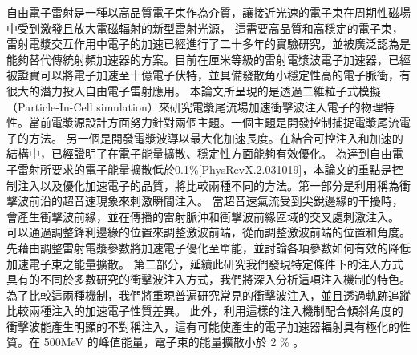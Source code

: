 
\begin{abstract*}
自由電子雷射是一種以高品質電子束作為介質，讓接近光速的電子束在周期性磁場中受到激發且放大電磁輻射的新型雷射光源，
這需要高品質和高穩定的電子束，雷射電漿交互作用中電子的加速已經進行了二十多年的實驗研究，並被廣泛認為是能夠替代傳統射頻加速器的方案。目前在厘米等級的雷射電漿波電子加速器，已經被證實可以將電子加速至十億電子伏特，並具備發散角小穩定性高的電子脈衝，有很大的潛力投入自由電子雷射應用。
本論文所呈現的是透過二維粒子式模擬（Particle-In-Cell simulation）來研究電漿尾流場加速衝擊波注入電子的物理特性。當前電漿源設計方面努力針對兩個主題。一個主題是開發控制捕捉電漿尾流電子的方法。
另一個是開發電漿波導以最大化加速長度。在結合可控注入和加速的結構中，已經證明了在電子能量擴散、穩定性方面能夠有效優化。
為達到自由電子雷射所要求的電子能量擴散低於0.1\%\ref{PhysRevX.2.031019}，本論文的重點是控制注入以及優化加速電子的品質，將比較兩種不同的方法。第一部分是利用稱為衝擊波前沿的超音速現象來刺激瞬間注入。
當超音速氣流受到尖銳邊緣的干擾時，會產生衝擊波前緣，並在傳播的雷射脈沖和衝擊波前緣區域的交叉處刺激注入。
可以通過調整鋒利邊緣的位置來調整激波前端，從而調整激波前端的位置和角度。
先藉由調整雷射電漿參數將加速電子優化至單能，並討論各項參數如何有效的降低加速電子束之能量擴散。
第二部分，延續此研究我們發現特定條件下的注入方式具有的不同於多數研究的衝擊波注入方式，我們將深入分析這項注入機制的特色。
為了比較這兩種機制，我們將重現普遍研究常見的衝擊波注入，並且透過軌跡追蹤比較兩種注入的加速電子性質差異。
此外，利用這樣的注入機制配合傾斜角度的衝擊波能產生明顯的不對稱注入，這有可能使產生的電子加速器輻射具有極化的性質。在 500MeV 的峰值能量，電子束的能量擴散小於 2 \% 。

\end{abstract*}
